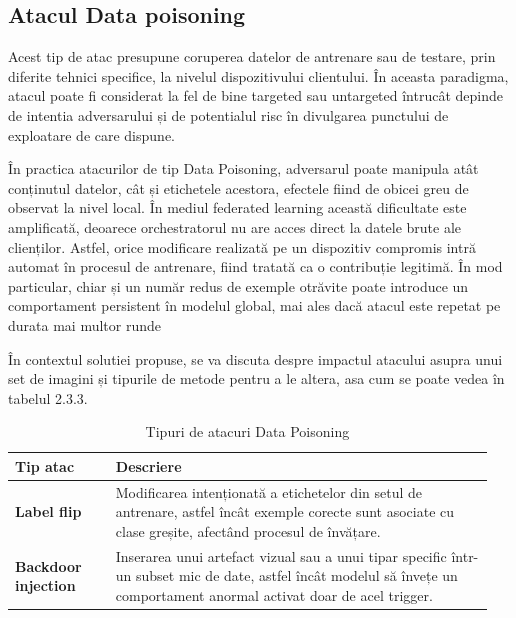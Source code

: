\documentclass[../../main.tex]{subfiles}
\begin{document}
    \subsection{Atacul Data poisoning}

    Acest tip de atac presupune coruperea datelor de antrenare sau de testare, prin diferite tehnici specifice, la nivelul dispozitivului clientului.
În aceasta paradigma, atacul poate fi considerat la fel de bine targeted sau untargeted întrucât depinde de intentia adversarului și de potentialul risc în divulgarea
punctului de exploatare de care dispune.


În practica atacurilor de tip Data Poisoning, adversarul poate manipula atât conținutul datelor, cât și etichetele acestora, efectele fiind de obicei greu de observat la nivel local.
În mediul federated learning această dificultate este amplificată, deoarece orchestratorul nu are acces direct la datele brute ale clienților. Astfel, orice modificare realizată pe un dispozitiv compromis intră automat în procesul de antrenare, fiind tratată ca o contribuție legitimă.
În mod particular, chiar și un număr redus de exemple otrăvite poate introduce un comportament persistent în modelul global, mai ales dacă atacul este repetat pe durata mai multor runde

În contextul solutiei propuse, se va discuta despre impactul atacului asupra unui set de imagini și tipurile de metode pentru a le altera, asa cum se poate vedea în tabelul 2.3.3.

    \begin{table}[h]
        \centering
        \begin{tabular}{ | p{0.20\linewidth} | p{0.75\linewidth} | }
            \hline
            \textbf{Tip atac} & \textbf{Descriere} \\
            \hline

            \textbf{Label flip}
            &
            Modificarea intenționată a etichetelor din setul de antrenare, astfel încât exemple corecte sunt asociate cu clase greșite, afectând procesul de învățare.
            \\
            \hline

            \textbf{Backdoor injection}
            &
            Inserarea unui artefact vizual sau a unui tipar specific într-un subset mic de date, astfel încât modelul să învețe un comportament anormal activat doar de acel trigger.
            \\
            \hline

        \end{tabular}
        \caption{Tipuri de atacuri Data Poisoning}
        \label{tab:data_poisoning_types}
    \end{table}
\end{document}
